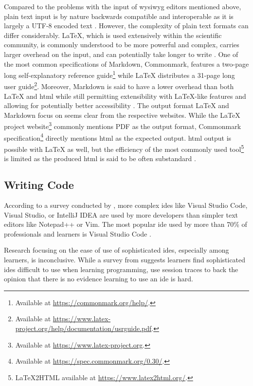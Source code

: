 Compared to the problems with the input of \gls{wysiwyg} editors mentioned above, plain text input is by nature backwards compatible and interoperable as it is largely a UTF-8 encoded text \parencite{shieber_why_2014}.
However, the complexity of plain text formats can differ considerably.
LaTeX, which is used extensively within the scientific community, is commonly understood to be more powerful and complex, carries larger overhead on the input, and can potentially take longer to write \parencites{baramidze_latex_2013}{knauff_efficiency_2014}{shieber_why_2014}.
One of the most common specifications of Markdown, Commonmark, features a two-page long self-explanatory reference guide\footnote{Available at \url{https://commonmark.org/help/}.} while LaTeX distributes a 31-page long user guide\footnote{Available at \url{https://www.latex-project.org/help/documentation/usrguide.pdf}.}.
Moreover, Markdown is said to have a lower overhead than both LaTeX and \gls{html} \parencite{shieber_why_2014} while still permitting extensibility with LaTeX-like features \parencite{shieber_why_2014} and allowing for potentially better accessibility \parencite{voegler_markdown_2014}.
The output format LaTeX and Markdown focus on seems clear from the respective websites.
While the LaTeX project website\footnote{Available at \url{https://www.latex-project.org}.} commonly mentions PDF as the output format, Commonmark specification\footnote{Available at \url{https://spec.commonmark.org/0.30/}.} directly mentions \gls{html} as the expected output.
\gls{html} output is possible with LaTeX as well, but the efficiency of the most commonly used tool\footnote{LaTeX2HTML available at \url{https://www.latex2html.org/}.} is limited as the produced \gls{html} is said to be often substandard \parencite{voegler_markdown_2014}.

\subsection{Writing Code}
\label{sec:writing-code}

According to a survey conducted by \textcite{StackOverflow_2023}, more complex \glspl{ide} like Visual Studio Code, Visual Studio, or IntelliJ IDEA are used by more developers than simpler text editors like Notepad++ or Vim.
The most popular \gls{ide} used by more than 70\% of professionals and learners is Visual Studio Code \parencite{StackOverflow_2023}.

Research focusing on the ease of use of sophisticated \glspl{ide}, especially among learners, is inconclusive.
While a survey from \textcite{owoseni_2016} suggests learners find sophisticated \glspl{ide} difficult to use when learning programming, \textcite{vihavainen_how_2014} use session traces to back the opinion that there is no evidence learning to use an \gls{ide} is hard.

